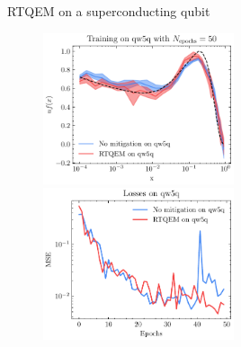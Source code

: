 \documentclass[8pt, xcolor={svgnames}, hyperref={linkcolor=black}]{beamer}
\begin{document}
\begin{frame}{RTQEM on a superconducting qubit}

\begin{figure}
    \includegraphics[width=0.5\textwidth]{figures/qw5q.pdf}%
    \includegraphics[width=0.5\textwidth]{figures/losses_qw5q.pdf}
\end{figure}
\end{frame}
\end{document}

